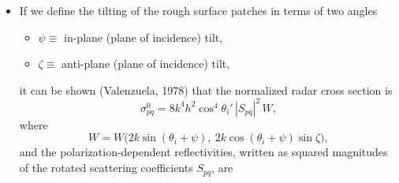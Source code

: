 \documentclass[11pt, oneside]{article}
\begin{document}
\begin{itemize}
	\item If we define the tilting of the rough surface patches in terms of two angles
	\begin{itemize}
		\item $\psi \equiv$ in-plane (plane of incidence) tilt,
		\item $\zeta \equiv$ anti-plane (plane of incidence) tilt,
	\end{itemize}
	it can be shown (Valenzuela, 1978) that the normalized radar cross section is
	\begin{equation}
		\label{e:tilt}
		\sigma_{pq}^0 = 8k^4h^2\cos^4\theta_i'\,|S_{pq}|^2\,W,
	\end{equation}
	where
	\begin{equation}
		\label{e:Wtilt}
		W = W\big(2k\sin(\theta_i + \psi),\ 2k\cos(\theta_i + \psi)\sin\zeta\big),
	\end{equation}
	and the polarization-dependent reflectivities, written as squared magnitudes of the rotated scattering coefficients $S_{pq}$, are

\end{itemize}
\end{document}
